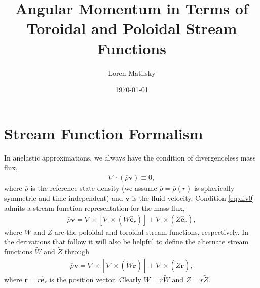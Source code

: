 \documentclass[12pt]{article} %
\date{\today}
\author{Loren Matilsky}
\title{Angular Momentum in Terms of Toroidal and Poloidal Stream Functions}
\newcommand{\tz}{\tilde{Z}}
\newcommand{\tw}{\tilde{W}}
\newcommand{\rhobar}{\overline{\rho}}
\newcommand{\curl}{\nabla\times}
\newcommand{\er}{\hat{\bm{e}}_r}
\begin{document}
	\maketitle
	\section{Stream Function Formalism}
In anelastic approximations, we always have the condition of divergenceless mass flux,
\begin{align}
\nabla\cdot(\rhobar\bm{v})\equiv 0,
\label{eq:div0}
\end{align}
where $\rhobar$ is the reference state density (we assume $\rhobar=\rhobar(r)$ is spherically symmetric and time-independent) and $\bm{v}$ is the fluid velocity. Condition \eqref{eq:div0} admits a stream function representation for the mass flux, 
\begin{align}
\rhobar\bm{v} = \curl [\curl (W\er)] + \curl(Z\er),
\label{eq:wandz1}
\end{align}
where $W$ and $Z$ are the poloidal and toroidal stream functions, respectively. In the derivations that follow it will also be helpful to define the alternate stream functions $\tw$ and $\tz$ through
\begin{align}
\rhobar\bm{v} = \curl [\curl (\tw\bm{r})] + \curl(\tz\bm{r}),
\label{eq:wandz2}
\end{align}
where $\bm{r}=r\er$ is the position vector. Clearly $W=r\tw$ and $Z=r\tz$. 
\end{document}
